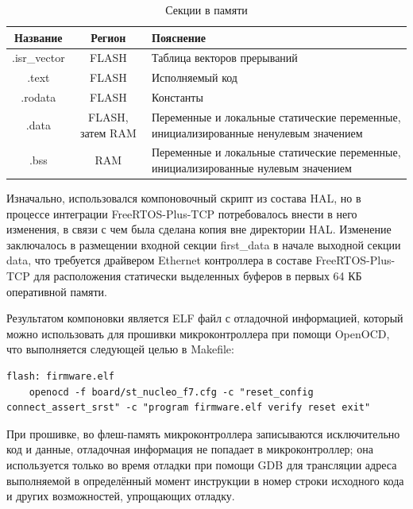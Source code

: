\documentclass[rusmathsym, eqnumwithinsec, amspack, hyperref]{bomgost}
\begin{document}
\begin{table}[H]
\centering
\caption{Секции в памяти}
\label{tab:memory_sections}
\begin{tabular}{|c|c|p{8cm}|}
\hline 
\textbf{Название} & \textbf{Регион} & \textbf{Пояснение} \\ 
\hline 
.isr\_vector & FLASH & Таблица векторов прерываний \\ 
\hline
.text & FLASH & Исполняемый код \\ 
\hline
.rodata & FLASH & Константы \\ 
\hline
.data & FLASH, затем RAM & Переменные и локальные статические переменные, инициализированные ненулевым значением \\ 
\hline
.bss & RAM & Переменные и локальные статические переменные, инициализированные нулевым значением \\ 
\hline
\end{tabular} 
\end{table}

Изначально, использовался компоновочный скрипт из состава HAL, но в процессе интеграции FreeRTOS-Plus-TCP потребовалось внести в него изменения, в связи с чем была сделана копия вне директории HAL. Изменение заключалось в размещении входной секции first\_data в начале выходной секции data, что требуется драйвером Ethernet контроллера в составе FreeRTOS-Plus-TCP для расположения статически выделенных буферов в первых 64 КБ оперативной памяти.

Результатом компоновки является ELF файл с отладочной информацией, который можно использовать для прошивки микроконтроллера при помощи OpenOCD, что выполняется следующей целью в Makefile:

\lstset{
	language=make,
	basicstyle=\scriptsize\ttfamily,
	numbers=left,
	stepnumber=1,
	showstringspaces=false,
	tabsize=4,
	breaklines=true,
	breakatwhitespace=false,
	xleftmargin=.1\textwidth, xrightmargin=.1\textwidth,
	belowskip=1em, aboveskip=1em
}
\begin{lstlisting}
flash: firmware.elf
	openocd -f board/st_nucleo_f7.cfg -c "reset_config connect_assert_srst" -c "program firmware.elf verify reset exit"
\end{lstlisting}

При прошивке, во флеш-память микроконтроллера записываются исключительно код и данные, отладочная информация не попадает в микроконтроллер; она используется только во время отладки при помощи GDB для трансляции адреса выполняемой в определённый момент инструкции в номер строки исходного кода и других возможностей, упрощающих отладку. 
\end{document}
